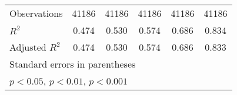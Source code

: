 {\begin{tabular}{l*{5}{c}}
\midrule
Observations        &       41186         &       41186         &       41186         &       41186         &       41186         \\
\(R^{2}\)           &       0.474         &       0.530         &       0.574         &       0.686         &       0.834         \\
Adjusted \(R^{2}\)  &       0.474         &       0.530         &       0.574         &       0.686         &       0.833         \\
\bottomrule
\multicolumn{6}{l}{\footnotesize Standard errors in parentheses}\\
\multicolumn{6}{l}{\footnotesize \sym{*} \(p<0.05\), \sym{**} \(p<0.01\), \sym{***} \(p<0.001\)}\\
\end{tabular}
}
